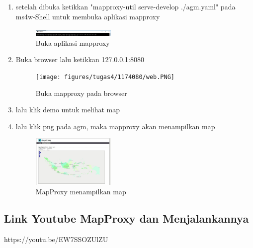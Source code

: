\begin{enumerate}
  \item setelah dibuka ketikkan "mapproxy-util serve-develop ./agm.yaml" pada ms4w-Shell untuk membuka aplikasi mapproxy
  \hfill\break
  \begin{figure}[H]
  \includegraphics[width=4cm]{figures/tugas4/1174080/util.PNG}
  \centering
  \caption{Buka aplikasi mapproxy}
  \end{figure}
  
  \item Buka browser lalu ketikkan 127.0.0.1:8080
  \hfill\break
  \begin{figure}[H]
  \texttt{[image: figures/tugas4/1174080/web.PNG]}
  \centering
  \caption{Buka mapproxy pada browser}
  \end{figure}

  \item lalu klik demo untuk melihat map
  \item lalu klik png pada agm, maka mapproxy akan menampilkan map
  \hfill\break
  \begin{figure}[H]
  \includegraphics[width=4cm]{figures/tugas4/1174080/mapjadi.PNG}
  \centering
  \caption{MapProxy menampilkan map}
  \end{figure}

\end{enumerate}

\subsection{Link Youtube MapProxy dan Menjalankannya}
https://youtu.be/EW7SSOZUlZU